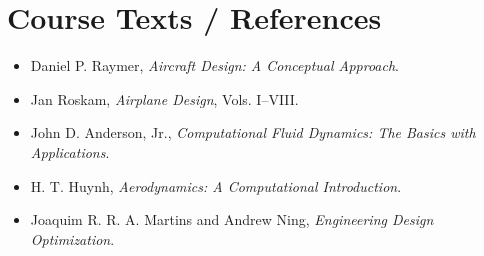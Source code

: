 \documentclass[10pt]{article}
\begin{document}
\section*{Course Texts / References}
\begin{itemize}
    \item Daniel P. Raymer, \emph{Aircraft Design: A Conceptual Approach}.
    \item Jan Roskam, \emph{Airplane Design}, Vols. I--VIII.
    \item John D. Anderson, Jr., \emph{Computational Fluid Dynamics: The Basics with Applications}.
    \item H. T. Huynh, \emph{Aerodynamics: A Computational Introduction}.
    \item Joaquim R. R. A. Martins and Andrew Ning, \emph{Engineering Design Optimization}.
\end{itemize}
\end{document}
